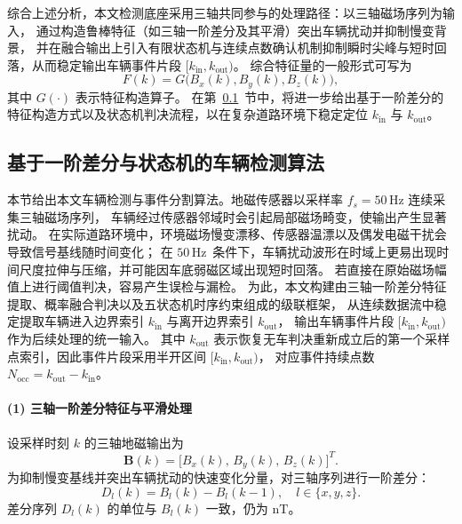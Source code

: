 \documentclass{xdupgthesis}
\newcommand{\Fs}{\ensuremath{50\,\mathrm{Hz}}}
\newcommand{\MagUnit}{\ensuremath{\mathrm{nT}}}
\begin{document}
综合上述分析，本文检测底座采用三轴共同参与的处理路径：以三轴磁场序列为输入，
通过构造鲁棒特征（如三轴一阶差分及其平滑）突出车辆扰动并抑制慢变背景，
并在融合输出上引入有限状态机与连续点数确认机制抑制瞬时尖峰与短时回落，从而稳定输出车辆事件片段 $[k_{\mathrm{in}}, k_{\mathrm{out}})$。
综合特征量的一般形式可写为
\begin{equation}
    F(k) = G\big(B_x(k), B_y(k), B_z(k)\big),
\end{equation}
其中 $G(\cdot)$ 表示特征构造算子。
在第~\ref{sec:vehicle_detection}~节中，将进一步给出基于一阶差分的特征构造方式以及状态机判决流程，以在复杂道路环境下稳定定位 $k_{\mathrm{in}}$ 与 $k_{\mathrm{out}}$。

\subsection{基于一阶差分与状态机的车辆检测算法}\label{sec:vehicle_detection}

本节给出本文车辆检测与事件分割算法。地磁传感器以采样率 $f_s = \Fs$ 连续采集三轴磁场序列，
车辆经过传感器邻域时会引起局部磁场畸变，使输出产生显著扰动。
在实际道路环境中，环境磁场慢变漂移、传感器温漂以及偶发电磁干扰会导致信号基线随时间变化；
在 \Fs\ 条件下，车辆扰动波形在时域上更易出现时间尺度拉伸与压缩，并可能因车底弱磁区域出现短时回落。
若直接在原始磁场幅值上进行阈值判决，容易产生误检与漏检。
为此，本文构建由三轴一阶差分特征提取、概率融合判决以及五状态机时序约束组成的级联框架，
从连续数据流中稳定提取车辆进入边界索引 $k_{\mathrm{in}}$ 与离开边界索引 $k_{\mathrm{out}}$，
输出车辆事件片段 $[k_{\mathrm{in}}, k_{\mathrm{out}})$ 作为后续处理的统一输入。
其中 $k_{\mathrm{out}}$ 表示恢复无车判决重新成立后的第一个采样点索引，因此事件片段采用半开区间 $[k_{\mathrm{in}}, k_{\mathrm{out}})$，
对应事件持续点数 $N_{\mathrm{occ}} = k_{\mathrm{out}} - k_{\mathrm{in}}$。

\paragraph*{(1) 三轴一阶差分特征与平滑处理}
设采样时刻 $k$ 的三轴地磁输出为
\begin{equation}
    \mathbf{B}(k) = \big[B_x(k),\,B_y(k),\,B_z(k)\big]^T .
\end{equation}
为抑制慢变基线并突出车辆扰动的快速变化分量，对三轴序列进行一阶差分：
\begin{equation}
    D_l(k) = B_l(k) - B_l(k-1),\quad l \in \{x, y, z\}.
\end{equation}
差分序列 $D_l(k)$ 的单位与 $B_l(k)$ 一致，仍为 \MagUnit。
\end{document}
